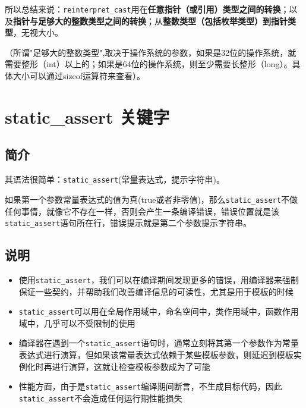 \documentclass[UTF8,a4paper,12pt]{ctexbook} %
\begin{document}
		所以总结来说：\verb|reinterpret_cast|用在\textbf{任意指针（或引用）类型之间的转换}；以及\textbf{指针与足够大的整数类型之间的转换}；从\textbf{整数类型（包括枚举类型）到指针类型}，无视大小。
		
		\color{green}（所谓"足够大的整数类型",取决于操作系统的参数，如果是32位的操作系统，就需要整形（int）以上的；如果是64位的操作系统，则至少需要长整形（long）。具体大小可以通过sizeof运算符来查看）。\color{black}
\chapter{static\_assert 关键字}
\section{简介}
	其语法很简单：\verb|static_assert|(常量表达式，提示字符串)。
	
	如果第一个参数常量表达式的值为真(true或者非零值)，那么\verb|static_assert|不做任何事情，就像它不存在一样，否则会产生一条编译错误，错误位置就是该\verb|static_assert|语句所在行，错误提示就是第二个参数提示字符串。
	
\section{说明}
	\begin{itemize}
		\item 使用\verb|static_assert|，我们可以在编译期间发现更多的错误，用编译器来强制保证一些契约，并帮助我们改善编译信息的可读性，尤其是用于模板的时候
		\item \verb|static_assert|可以用在全局作用域中，命名空间中，类作用域中，函数作用域中，几乎可以不受限制的使用
		\item 编译器在遇到一个\verb|static_assert|语句时，通常立刻将其第一个参数作为常量表达式进行演算，但如果该常量表达式依赖于某些模板参数，则延迟到模板实例化时再进行演算，这就让检查模板参数成为了可能
		\item 性能方面，由于是\verb|static_assert|编译期间断言，不生成目标代码，因此\verb|static_assert|不会造成任何运行期性能损失
	\end{itemize}
\end{document}
